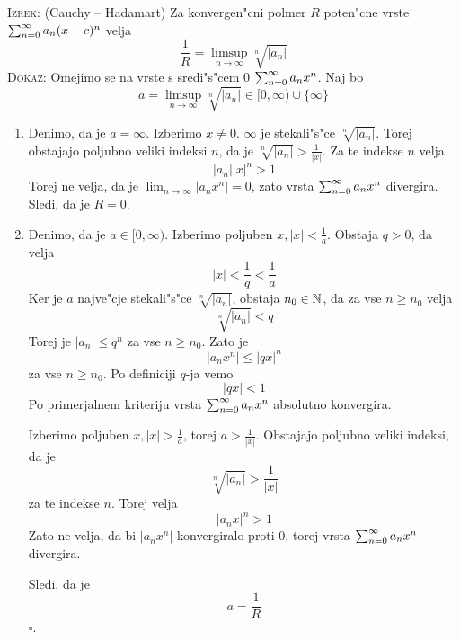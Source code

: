 \textsc{Izrek:} (Cauchy -- Hadamart) Za konvergen"cni polmer $R$ poten"cne vrste $\sum_{n = 0}^{\infty} a_n (x - c)^n$ velja
\begin{equation*}
\dfrac{1}{R} = \limsup_{n \to \infty} \sqrt[n]{|a_n|}
\end{equation*}
\textsc{Dokaz:} Omejimo se na vrste s sredi"s"cem 0 $\sum_{n = 0}^{\infty} a_n x^n$. Naj bo 
\begin{equation*}
a = \limsup_{n \to \infty} \sqrt[n]{|a_n|} \in [0, \infty) \cup \{ \infty \}
\end{equation*}
\begin{enumerate}
    \item Denimo, da je $a = \infty$. Izberimo $x \neq 0$. $\infty$ je stekali"s"ce $\sqrt[n]{|a_n|}$. Torej obstajajo poljubno veliki indeksi $n$, da je $\sqrt[n]{|a_n|} > \frac{1}{|x|}$. Za te indekse $n$ velja
    \begin{equation*}
    |a_n| |x|^n > 1
    \end{equation*}
    Torej ne velja, da je $\lim_{n \to \infty} |a_n x^n| = 0$, zato vrsta $\sum_{n = 0}^{\infty} a_n x^n$ divergira. Sledi, da je $R = 0$.
    
    \item Denimo, da je $a \in [0, \infty)$. Izberimo poljuben $x, |x| < \frac{1}{a}$. Obstaja $q > 0$, da velja
    \begin{equation*}
    |x| < \frac{1}{q} < \frac{1}{a}
    \end{equation*}
    Ker je $a$ najve"cje stekali"s"ce $\sqrt[n]{|a_n|}$, obstaja $n_0 \in \mathbb{N}$, da za vse $n \geq n_0$ velja
    \begin{equation*}
    \sqrt[n]{|a_n|} < q
    \end{equation*}
    Torej je $|a_n| \leq q^n$ za vse $n \geq n_0$. Zato je
    \begin{equation*}
    |a_n x^n| \leq |q x|^n
    \end{equation*}
    za vse $n \geq n_0$. Po definiciji $q$-ja vemo
    \begin{equation*}
    |qx| < 1
    \end{equation*}
    Po primerjalnem kriteriju vrsta $\sum_{n = 0}^{\infty} a_n x^n$ absolutno konvergira.
    
    Izberimo poljuben $x, |x| > \frac{1}{a}$, torej $a > \frac{1}{|x|}$. Obstajajo poljubno veliki indeksi, da je
    \begin{equation*}
    \sqrt[n]{|a_n|} > \dfrac{1}{|x|}
    \end{equation*}
    za te indekse $n$. Torej velja
    \begin{equation*}
    |a_n x|^n > 1
    \end{equation*}
    Zato ne velja, da bi $|a_n x^n|$ konvergiralo proti 0, torej vrsta $\sum_{n = 0}^{\infty} a_n x^n$ divergira.
    
    Sledi, da je
    \begin{equation*}
    a = \dfrac{1}{R}
    \end{equation*}
    \hfill $\square$.
\end{enumerate}
